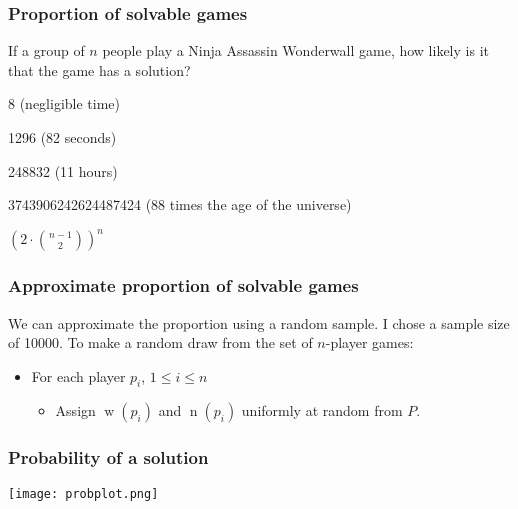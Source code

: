 \documentclass[svgnames]{beamer}
\DeclareMathOperator{\w}{w}
\DeclareMathOperator{\n}{n}
\begin{document}
\begin{frame}
\frametitle{Proportion of solvable games}
If a group of $n$ people play a Ninja Assassin Wonderwall game, how likely is it that the game has a solution? 

\begin{description}
    \item<3->[n=3] 8 \quad (negligible time)
    \item<4->[n=4] 1296 \quad (82 seconds)
    \item<5->[n=5] 248832 \quad (11 hours)
    \item<6->[$\vdots$] \text{}
    \item<7->[n=10] 3743906242624487424 \quad (88 times the age of the universe)
    \item<8->[$\vdots$] \text{}
    \item<9->[General $n$:] $\displaystyle \left(2 \cdot \binom{n-1}{2} \right)^n $
\end{description}
\end{frame}

\begin{frame}
\frametitle{Approximate proportion of solvable games}
We can approximate the proportion using a random sample. I chose a sample size of 10000. To make a random draw from the set of $n$-player games:
\begin{itemize}
    \item<2-> For each player $p_i$, $1\leq i \leq n$
    \begin{itemize}
        \item<3-> Assign $\w(p_i)$ and $\n(p_i)$ uniformly at random from $P$.
    \end{itemize}
\end{itemize}
\vspace{12pt}

\end{frame}


\begin{frame}
\frametitle{Probability of a solution}
\begin{center}
\texttt{[image: probplot.png]}
\end{center}
\end{frame}
\end{document}
